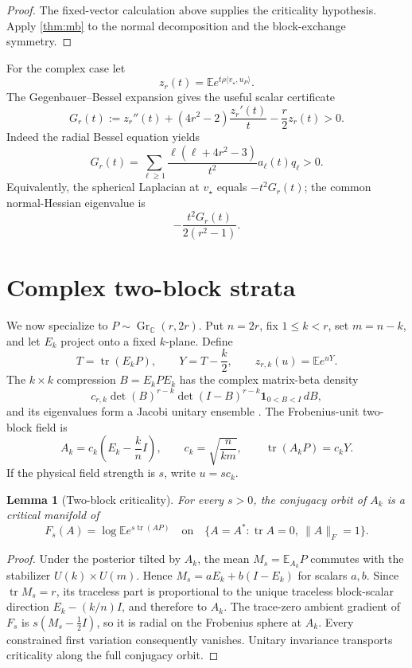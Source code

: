 \documentclass[11pt]{article}
\newtheorem{lemma}[theorem]{Lemma}
\newcommand{\E}{\mathbb E}
\newcommand{\C}{\mathbb C}
\newcommand{\tr}{\operatorname{tr}}
\newcommand{\Gr}{\operatorname{Gr}}
\newcommand{\ip}[2]{\langle #1,#2\rangle}
\newcommand{\norm}[1]{\lVert #1\rVert}
\begin{document}
\begin{proof}
The fixed-vector calculation above supplies the criticality hypothesis.
Apply \cref{thm:mb} to the normal decomposition and the block-exchange
symmetry.
\end{proof}

For the complex case let
\[
 z_r(t)=\E e^{t\rho\ip{v_\star}{u_P}}.
\]
The Gegenbauer--Bessel expansion gives the useful scalar certificate
\[
 \boxed{G_r(t):=z_r''(t)+(4r^2-2)\frac{z_r'(t)}t-\frac r2z_r(t)>0.}          \tag{4.5}
\]
Indeed the radial Bessel equation yields
\[
 G_r(t)=\sum_{\ell\ge1}\frac{\ell(\ell+4r^2-3)}{t^2}
 a_{\ell}(t)q_\ell>0.                                      \tag{4.6}
\]
Equivalently, the spherical Laplacian at $v_\star$ equals $-t^2G_r(t)$;
the common normal-Hessian eigenvalue is
\[
 -\frac{t^2G_r(t)}{2(r^2-1)}.                               \tag{4.7}
\]

\section{Complex two-block strata}

We now specialize to $P\sim\Gr_{\C}(r,2r)$.  Put $n=2r$, fix
$1\le k<r$, set $m=n-k$, and let $E_k$ project onto a fixed $k$-plane.
Define
\[
 T=\tr(E_kP),\qquad Y=T-\frac k2,\qquad z_{r,k}(u)=\E e^{uY}.               \tag{5.1}
\]
The $k\times k$ compression $B=E_kPE_k$ has the complex matrix-beta density
\[
 c_{r,k}\det(B)^{r-k}\det(I-B)^{r-k}\mathbf1_{0<B<I}\,dB,                \tag{5.2}
\]
and its eigenvalues form a Jacobi unitary ensemble
\cite{James1964,Muirhead1982,DumitriuEdelman2002}.  The Frobenius-unit
two-block field is
\[
 A_k=c_k\left(E_k-\frac{k}{n}I\right),\qquad
 c_k=\sqrt{\frac{n}{km}},\qquad \tr(A_kP)=c_kY.             \tag{5.3}
\]
If the physical field strength is $s$, write $u=sc_k$.

\begin{lemma}[Two-block criticality]\label{lem:twoblock-critical}
For every $s>0$, the conjugacy orbit of $A_k$ is a critical manifold of
\[
 F_s(A)=\log\E e^{s\tr(AP)}
 \quad\text{on}\quad \{A=A^*: \tr A=0,\ \norm A_F=1\}.
\]
\end{lemma}

\begin{proof}
Under the posterior tilted by $A_k$, the mean $M_s=\E_{A_k}P$ commutes with
the stabilizer $U(k)\times U(m)$.  Hence
$M_s=aE_k+b(I-E_k)$ for scalars $a,b$.  Since $\tr M_s=r$, its traceless part
is proportional to the unique traceless block-scalar direction
$E_k-(k/n)I$, and therefore to $A_k$.  The trace-zero ambient gradient of
$F_s$ is $s(M_s-\tfrac12I)$, so it is radial on the Frobenius sphere at
$A_k$.  Every constrained first variation consequently vanishes.  Unitary
invariance transports criticality along the full conjugacy orbit.
\end{proof}
\end{document}
